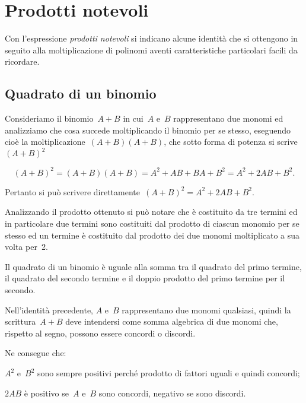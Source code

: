 
\chapter{Prodotti notevoli}

Con l'espressione \emph{prodotti notevoli} si indicano alcune
identità che si ottengono in seguito alla moltiplicazione di polinomi
aventi caratteristiche particolari facili da ricordare.

\section{Quadrato di un binomio}\label{sect:quadrato_di_un_binomio}

Consideriamo il binomio~$A+B$ in cui~$A$ e~$B$ rappresentano due monomi ed
analizziamo che cosa succede moltiplicando il binomio per se
stesso, eseguendo cioè la
moltiplicazione~$\left(A+B\right)\left(A+B\right)$, che sotto forma di potenza si scrive~$\left(A+B\right)^{2}$

\[\left(A+B\right)^{2}=\left(A+B\right)\left(A+B\right)=A^{2}+{AB}+{BA}+B^{2}=A^{2}+2{AB}+B^{2}.\]

Pertanto si può scrivere direttamente~$\left(A+B\right)^{2}=A^{2}+2{AB}+B^{2}$.

Analizzando il prodotto ottenuto si può notare che è costituito da
tre termini ed in particolare due termini sono costituiti dal prodotto
di ciascun monomio per se stesso ed un termine è costituito dal
prodotto dei due monomi moltiplicato a sua volta per~2.

\osservazione Il quadrato di un binomio è
uguale alla somma tra il quadrato del primo termine, il quadrato del
secondo termine e il doppio prodotto del primo termine per il secondo.

Nell'identità precedente, $A$ e~$B$ rappresentano due monomi qualsiasi,
quindi la scrittura~$A+B$ deve intendersi come somma algebrica di due
monomi che, rispetto al segno, possono essere concordi o discordi.

Ne consegue che:

\begin{enumeratea}
\item $A^{2}$ e~$B^{2}$ sono sempre positivi
perché prodotto di fattori uguali e quindi concordi;
\item $2AB$ è positivo se~$A$ e~$B$ sono concordi, negativo se sono
discordi.
\end{enumeratea}

